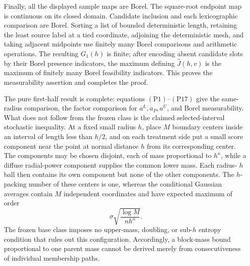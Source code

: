 Finally, all the displayed sample maps are Borel.  The square-root endpoint
map is continuous on its closed domain.  Candidate inclusion and each
lexicographic comparison are Borel.  Sorting a list of bounded deterministic
length, retaining the least source label at a tied coordinate, adjoining the
deterministic mesh, and taking adjacent midpoints use finitely many Borel
comparisons and arithmetic operations.  The resulting \(G_1(h)\) is finite;
after encoding absent candidate slots by their Borel presence indicators,
the maximum defining \(\widehat J(h,v)\) is the maximum of finitely many
Borel feasibility indicators.  This proves the measurability assertion and
completes the proof.

The pure first-half result is complete: equations \((\mathrm{P1})\)--\((\mathrm{P17})\)
give the same-radius comparison, the factor comparison for \(a^L,a_P,a^U\),
and Borel measurability.  What does not follow from the frozen class is the
claimed selected-interval stochastic inequality.  At a fixed small radius
\(h\), place \(M\) boundary centers inside an interval of length less than
\(h/2\), and on each treatment side put a small score component near the
point at normal distance \(h\) from its corresponding center.  The components
may be chosen disjoint, each of mass proportional to \(h^\kappa\), while a
diffuse radial-power component supplies the common lower mass.  Each radius-
\(h\) ball then contains its own component but none of the other components.
The \(h\)-packing number of these centers is one, whereas the conditional
Gaussian averages contain \(M\) independent coordinates and have expected
maximum of order
\[
 \sigma\sqrt{\frac{\log M}{nh^\kappa}}.
\]
The frozen base class imposes no upper-mass, doubling, or sub-\(h\) entropy
condition that rules out this configuration.  Accordingly, a block-mass
bound proportional to one parent mass cannot be derived merely from
consecutiveness of individual membership paths.
